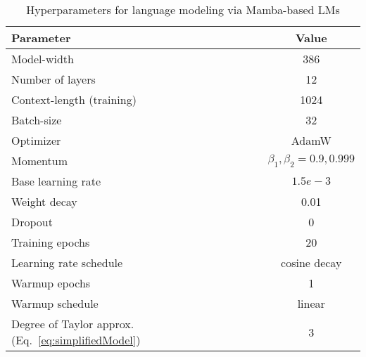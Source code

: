 \begin{table}[h]
\centering
\small
\begin{tabular}{l c}
\toprule
\textbf{Parameter} & \textbf{Value} \\
\midrule
Model-width & 386 \\
Number of layers & 12 \\
Context-length (training) & 1024 \\
Batch-size & 32 \\
Optimizer & AdamW \\
Momentum & \( \beta_1, \beta_2 = 0.9, 0.999 \) \\
Base learning rate & $1.5e-3$ \\
Weight decay & 0.01 \\
Dropout & 0 \\
Training epochs & 20 \\
Learning rate schedule & cosine decay  \\
Warmup epochs & 1  \\
Warmup schedule & linear  \\ 
Degree of Taylor approx. (Eq.~\ref{eq:simplifiedModel}) &  3\\
\bottomrule
\end{tabular}
\caption{Hyperparameters for language modeling via Mamba-based LMs} 
\label{tab:NLPhyperpams}
\end{table}





